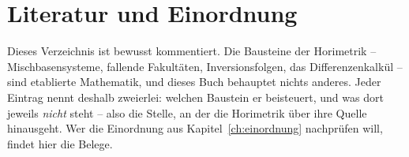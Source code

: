 \chapter*{Literatur und Einordnung}

Dieses Verzeichnis ist bewusst kommentiert. Die Bausteine der
Horimetrik -- Mischbasensysteme, fallende Fakultäten,
Inversionsfolgen, das Differenzenkalkül -- sind etablierte
Mathematik, und dieses Buch behauptet nichts anderes. Jeder Eintrag
nennt deshalb zweierlei: welchen Baustein er beisteuert, und was
dort jeweils \emph{nicht} steht -- also die Stelle, an der die
Horimetrik über ihre Quelle hinausgeht. Wer die Einordnung aus
Kapitel~\ref{ch:einordnung} nachprüfen will, findet hier die
Belege.

